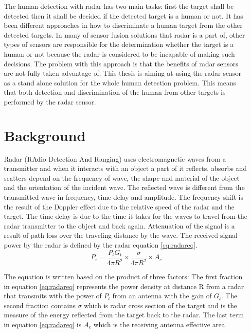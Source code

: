 The human detection with radar has two main tasks: first the target shall be detected then it shall be decided if the detected target is a human or not. It has been different approaches in how to discriminate a human target from the other detected targets. In many of sensor fusion solutions that radar is a part of, other types of sensors are responsible for the determination whether the target is a human or not because the radar is considered to be incapable of making such decisions. The problem with this approach is that the benefits of radar sensors are not fully taken advantage of. This thesis is aiming at using the radar sensor as a stand alone solution for the whole human detection problem. This means that both detection and discrimination of the human from other targets is performed by the radar sensor. 
  
\section{Background}

Radar (RAdio Detection And Ranging) uses electromagnetic waves from a transmitter and when it interacts with an object a part of it reflects, absorbs and scatters depend on the frequency of wave, the shape and material of the object and the orientation of the incident wave. The reflected wave is different from the transmitted wave in frequency, time delay and amplitude. The frequency shift is the result of the Doppler effect due to the relative speed of the radar and the target. The time delay is due to the time it takes for the waves to travel from the radar transmitter to the object and back again. Attenuation of the signal is a result of path loss over the traveling distance by the wave. The received signal power by the radar is defined by the radar equation \ref{eq:radareq}.
\begin{equation}\label{eq:radareq}
	P_{r}= \frac{P_{t} G_{t}}{4\pi R^{2}}\times\frac{\sigma}{4\pi R^{2}}\times A_{e}
\end{equation}

The equation is written based on the product of three factors: The first fraction in equation \ref{eq:radareq} represents the power density at distance R from a radar that transmits with the power of $P_{t}$ from an antenna with the gain of $G_{t}$. The second fraction contains $\sigma$ which is radar cross section of the target and is the measure of the energy reflected from the target back to the radar. The last term in equation \ref{eq:radareq} is  $A_{e}$ which is the receiving antenna effective area\cite{skolnik2008radar}. 

